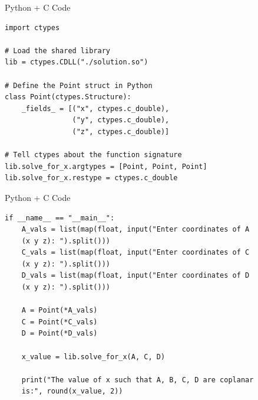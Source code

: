 \documentclass{beamer}
\begin{document}
\begin{frame}[fragile]{Python + C Code}
    \begin{verbatim}
import ctypes

# Load the shared library
lib = ctypes.CDLL("./solution.so")

# Define the Point struct in Python
class Point(ctypes.Structure):
    _fields_ = [("x", ctypes.c_double),
                ("y", ctypes.c_double),
                ("z", ctypes.c_double)]

# Tell ctypes about the function signature
lib.solve_for_x.argtypes = [Point, Point, Point]
lib.solve_for_x.restype = ctypes.c_double
    \end{verbatim}
\end{frame}

\begin{frame}[fragile]{Python + C Code}
    \begin{verbatim}
if __name__ == "__main__":
    A_vals = list(map(float, input("Enter coordinates of A 
    (x y z): ").split()))
    C_vals = list(map(float, input("Enter coordinates of C 
    (x y z): ").split()))
    D_vals = list(map(float, input("Enter coordinates of D 
    (x y z): ").split()))

    A = Point(*A_vals)
    C = Point(*C_vals)
    D = Point(*D_vals)

    x_value = lib.solve_for_x(A, C, D)

    print("The value of x such that A, B, C, D are coplanar 
    is:", round(x_value, 2))
    \end{verbatim}
\end{frame}
\end{document}
